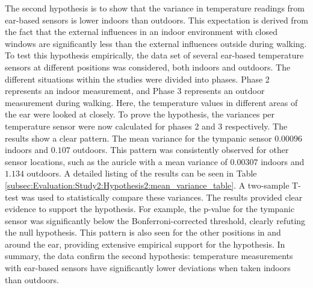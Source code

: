 The second hypothesis is to show that the variance in temperature readings from ear-based sensors is lower indoors than outdoors.
This expectation is derived from the fact that the external influences in an indoor environment with closed windows are significantly less than the external influences outside during walking.
To test this hypothesis empirically, the data set of several ear-based temperature sensors at different positions was considered, both indoors and outdoors.
The different situations within the studies were divided into phases. 
Phase 2 represents an indoor measurement, and Phase 3 represents an outdoor measurement during walking.
Here, the temperature values in different areas of the ear were looked at closely.
To prove the hypothesis, the variances per temperature sensor were now calculated for phases 2 and 3 respectively. 
The results show a clear pattern. 
The mean variance for the tympanic sensor $0.00096$ indoors and \(0.107\) outdoors.
This pattern was consistently observed for other sensor locations, such as the auricle with a mean variance of $0.00307$ indoors and $1.134$ outdoors.
A detailed listing of the results can be seen in Table \ref{subsec:Evaluation:Study2:Hypothesis2:mean_variance_table}.
A two-sample T-test was used to statistically compare these variances.
The results provided clear evidence to support the hypothesis.
For example, the p-value for the tympanic sensor was significantly below the Bonferroni-corrected threshold, clearly refuting the null hypothesis.
This pattern is also seen for the other positions in and around the ear, providing extensive empirical support for the hypothesis.
In summary, the data confirm the second hypothesis: temperature measurements with ear-based sensors have significantly lower deviations when taken indoors than outdoors.

